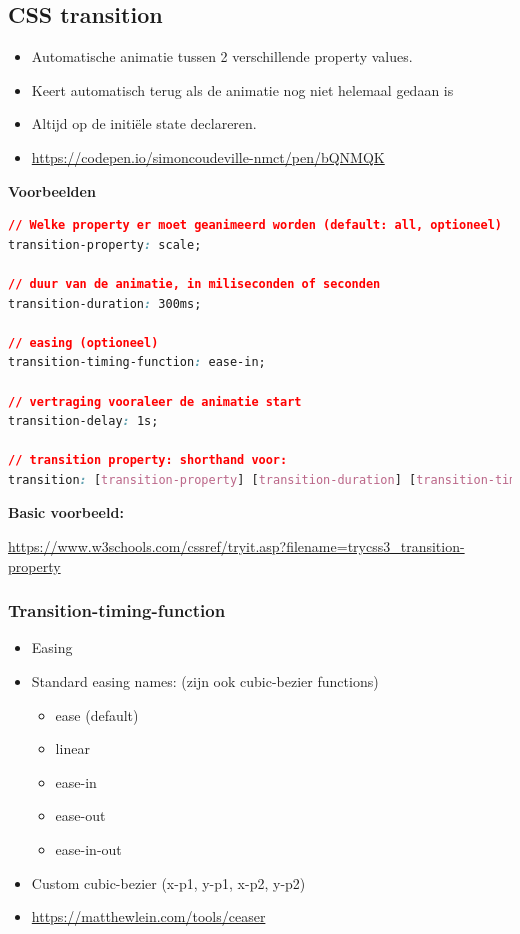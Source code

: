\documentclass{article}
\newcommand{\bold}[1]{\textbf{#1}}
\begin{document}
\subsection{CSS transition}
\begin{itemize}
    \item Automatische animatie tussen 2 verschillende property values.
    \item Keert automatisch terug als de animatie nog niet helemaal gedaan is
    \item Altijd op de initiële state declareren.
    \item \url{https://codepen.io/simoncoudeville-nmct/pen/bQNMQK}
\end{itemize}

\bold{Voorbeelden}

\begin{lstlisting}[language=CSS]
// Welke property er moet geanimeerd worden (default: all, optioneel)
transition-property: scale;

// duur van de animatie, in miliseconden of seconden
transition-duration: 300ms;

// easing (optioneel)
transition-timing-function: ease-in;

// vertraging vooraleer de animatie start
transition-delay: 1s;

// transition property: shorthand voor:
transition: [transition-property] [transition-duration] [transition-timing-function] [transition-delay];
\end{lstlisting}

\bold{Basic voorbeeld:}

\url{https://www.w3schools.com/cssref/tryit.asp?filename=trycss3_transition-property}

\subsubsection{Transition-timing-function}

\begin{itemize}
    \item Easing
    \item Standard easing names: (zijn ook cubic-bezier functions)
    \begin{itemize}
        \item ease (default)
        \item linear
        \item ease-in
        \item ease-out
        \item ease-in-out
    \end{itemize}
    \item Custom cubic-bezier (x-p1, y-p1, x-p2, y-p2)
    \item \url{https://matthewlein.com/tools/ceaser}
\end{itemize}
\end{document}
